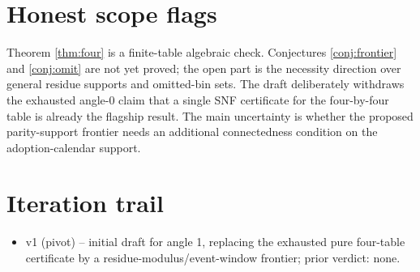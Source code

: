 \documentclass[11pt]{article}
\theoremstyle{definition}
\theoremstyle{plain}
\theoremstyle{remark}
\begin{document}
\section{Honest scope flags}
Theorem \ref{thm:four} is a finite-table algebraic check. Conjectures \ref{conj:frontier} and \ref{conj:omit} are not yet proved; the open part is the necessity direction over general residue supports and omitted-bin sets. The draft deliberately withdraws the exhausted angle-0 claim that a single SNF certificate for the four-by-four table is already the flagship result. The main uncertainty is whether the proposed parity-support frontier needs an additional connectedness condition on the adoption-calendar support.

\section{Iteration trail}
\begin{itemize}[leftmargin=*]
\item v1 (pivot) -- initial draft for angle 1, replacing the exhausted pure four-table certificate by a residue-modulus/event-window frontier; prior verdict: none.
\end{itemize}
\end{document}
